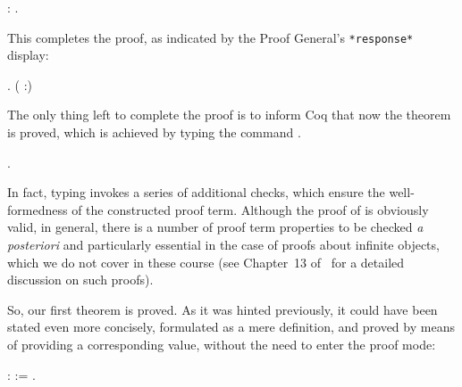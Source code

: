 \begin{coqdoccode}
\coqdocemptyline
\coqdocnoindent
{}: .\coqdoceol
\coqdocemptyline
\end{coqdoccode}


This completes the proof, as indicated by the Proof General's
\texttt{*response*} display:


\coqdoceol
\coqdocemptyline
\coqdocnoindent
{}  .\coqdoceol
\coqdocnoindent
( :)

\coqdocemptyline


The only thing left to complete the proof is to inform Coq that now
the theorem  is proved, which is achieved by typing the
command  .


\begin{coqdoccode}
\coqdocemptyline
\coqdocnoindent
{}.\coqdoceol
\coqdocemptyline
\end{coqdoccode}


In fact, typing  invokes a series of additional checks, which
ensure the well-formedness of the constructed proof term. Although the
proof of  is obviously valid, in general, there is a
number of proof term properties to be checked \textit{a posteriori} and
particularly essential in the case of proofs about infinite objects,
which we do not cover in these course (see Chapter~13
of~\cite{Bertot-Casteran:BOOK} for a detailed discussion on such
proofs).


So, our first theorem is proved. As it was hinted previously, it could
have been stated even more concisely, formulated as a mere definition,
and proved by means of providing a corresponding value, without the
need to enter the proof mode:


\begin{coqdoccode}
\coqdocemptyline
\coqdocnoindent
{} :  := .\coqdoceol
\coqdocemptyline
\end{coqdoccode}


